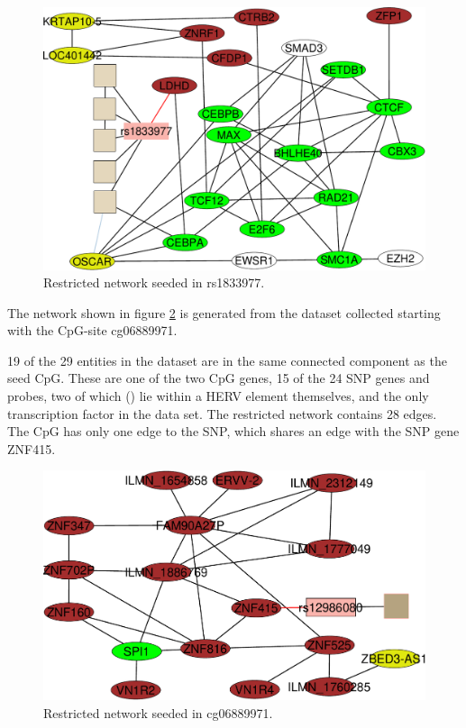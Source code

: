 \documentclass[a4paper,12pt,twoside,openright]{article}
\begin{document}
\begin{figure}[tb]
	\includegraphics[scale = 0.6, keepaspectratio = true]{"../figures/rs1833977"}  
	\caption{Restricted network seeded in rs1833977. }
    \label{fig:rs1833977.ggm.network}
\end{figure}



The network shown in figure \ref{fig:cg06889971.ggm.network} is generated from the dataset collected starting with the CpG-site cg06889971. 

19 of the 29 entities in the dataset are in the same connected component as the seed CpG. These are one of the two CpG genes, 15 of the 24 SNP genes and probes, two of which () lie within a HERV element themselves, and the only transcription factor in the data set. The restricted network contains 28 edges. The CpG has only one edge to the SNP, which shares an edge with the SNP gene ZNF415. 
\begin{figure}[tb]
	\includegraphics[scale = 0.6, keepaspectratio = true]{"../figures/cg06889971"}  
	\caption{Restricted network seeded in cg06889971. }
    \label{fig:cg06889971.ggm.network}
\end{figure}
\end{document}
